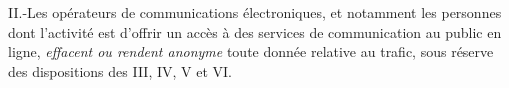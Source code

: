 \documentclass[]{article}
\newenvironment{environnement}{\itshape}{}
\begin{document}
\begin{environnement}

II.-Les opérateurs de communications électroniques, et notamment les
personnes dont l'activité est d'offrir un accès à des services de
communication au public en ligne, \emph{effacent ou rendent anonyme}
toute donnée relative au trafic, sous réserve des dispositions des III,
IV, V et VI.

\end{environnement}

\end{document}

